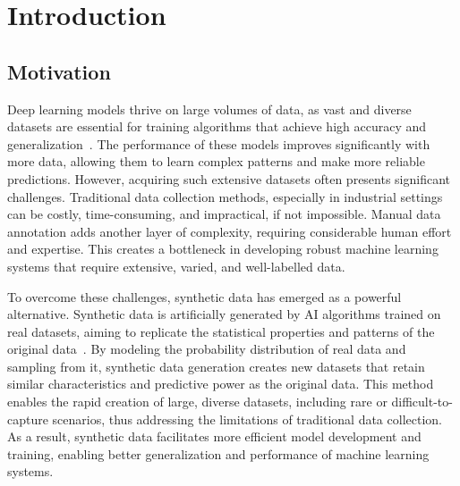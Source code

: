 \documentclass[12pt,DIV14,BCOR12mm,a4paper,footinclude=false,headinclude,parskip=half-,twoside,openright,cleardoublepage=empty,toc=index,bibliography=totoc,listof=totoc]{scrreprt}
\title{\maintitle}%
\subtitle{\translatedtitle}
\author{
\large
  \ifthenelse{\equal{\doclang}{german}}{
  \begin{tabular}{rp{7cm}}
    \Large 
    Autor:      & \Large \student \vspace*{2mm}\\
    Ausgabe:    & \startdate \\
    Abgabe:     & \submission \vspace*{3mm}\\
    Betreuer:   & \tutor \vspace*{2mm}\\
    Stichworte: & \keywords
  \end{tabular}
  }{
  \begin{tabular}{rp{7cm}}
    \Large 
    Author:             & \Large \student \vspace*{2mm}\\
    Date of work begin: & \startdate \\
    Date of submission: & \submission \vspace*{3mm}\\
    Supervisor:         & \tutor \vspace*{2mm}\\
    Keywords:           & \keywords
  \end{tabular}
  }
  \bugfix
}
\date{}
\numberwithin{equation}{chapter}
\begin{document}
\maketitle
{} %
\tableofcontents
\cleardoublepage
\setcounter{page}{1}


\chapter{Introduction}
\section{Motivation}
Deep learning models thrive on large volumes of data, as vast and diverse datasets are essential for training algorithms that achieve high accuracy and generalization~\cite{r1}. The performance of these models improves significantly with more data, allowing them to learn complex patterns and make more reliable predictions. However, acquiring such extensive datasets often presents significant challenges. Traditional data collection methods, especially in industrial settings can be costly, time-consuming, and impractical, if not impossible. Manual data annotation adds another layer of complexity, requiring considerable human effort and expertise. This creates a bottleneck in developing robust machine learning systems that require extensive, varied, and well-labelled data.

To overcome these challenges, synthetic data has emerged as a powerful alternative. Synthetic data is artificially generated by AI algorithms trained on real datasets, aiming to replicate the statistical properties and patterns of the original data~\cite{r2}. By modeling the probability distribution of real data and sampling from it, synthetic data generation creates new datasets that retain similar characteristics and predictive power as the original data. This method enables the rapid creation of large, diverse datasets, including rare or difficult-to-capture scenarios, thus addressing the limitations of traditional data collection. As a result, synthetic data facilitates more efficient model development and training, enabling better generalization and performance of machine learning systems.
\end{document}
